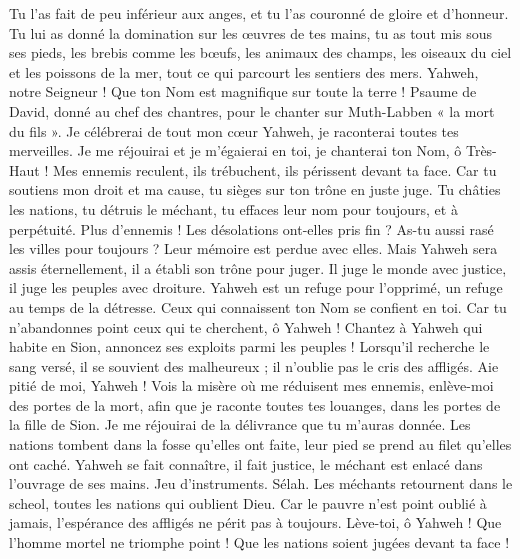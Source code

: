 \begin{multicols}{2}
Tu l'as fait de peu inférieur aux anges, et tu l'as couronné de gloire et d'honneur.
Tu lui as donné la domination sur les œuvres de tes mains, tu as tout mis sous ses pieds,
les brebis comme les bœufs, les animaux des champs,
les oiseaux du ciel et les poissons de la mer, tout ce qui parcourt les sentiers des mers.
Yahweh, notre Seigneur ! Que ton Nom est magnifique sur toute la terre !
\VerseOne{}Psaume de David, donné au chef des chantres, pour le chanter sur Muth-Labben « la mort du fils ».
Je célébrerai de tout mon cœur Yahweh, je raconterai toutes tes merveilles.
Je me réjouirai et je m'égaierai en toi, je chanterai ton Nom, ô Très-Haut !
Mes ennemis reculent, ils trébuchent, ils périssent devant ta face.
Car tu soutiens mon droit et ma cause, tu sièges sur ton trône en juste juge.
Tu châties les nations, tu détruis le méchant, tu effaces leur nom pour toujours, et à perpétuité.
Plus d'ennemis ! Les désolations ont-elles pris fin ? As-tu aussi rasé les villes pour toujours ? Leur mémoire est perdue avec elles.
Mais Yahweh sera assis éternellement, il a établi son trône pour juger.
Il juge le monde avec justice, il juge les peuples avec droiture.
Yahweh est un refuge pour l'opprimé, un refuge au temps de la détresse.
Ceux qui connaissent ton Nom se confient en toi. Car tu n'abandonnes point ceux qui te cherchent, ô Yahweh !
Chantez à Yahweh qui habite en Sion, annoncez ses exploits parmi les peuples !
Lorsqu'il recherche le sang versé, il se souvient des malheureux ; il n'oublie pas le cris des affligés.
Aie pitié de moi, Yahweh ! Vois la misère où me réduisent mes ennemis, enlève-moi des portes de la mort,
afin que je raconte toutes tes louanges, dans les portes de la fille de Sion. Je me réjouirai de la délivrance que tu m'auras donnée.
Les nations tombent dans la fosse qu'elles ont faite, leur pied se prend au filet qu'elles ont caché.
Yahweh se fait connaître, il fait justice, le méchant est enlacé dans l'ouvrage de ses mains. Jeu d'instruments. Sélah.
Les méchants retournent dans le scheol, toutes les nations qui oublient Dieu.
Car le pauvre n'est point oublié à jamais, l'espérance des affligés ne périt pas à toujours.
Lève-toi, ô Yahweh ! Que l'homme mortel ne triomphe point ! Que les nations soient jugées devant ta face !

\end{multicols}
